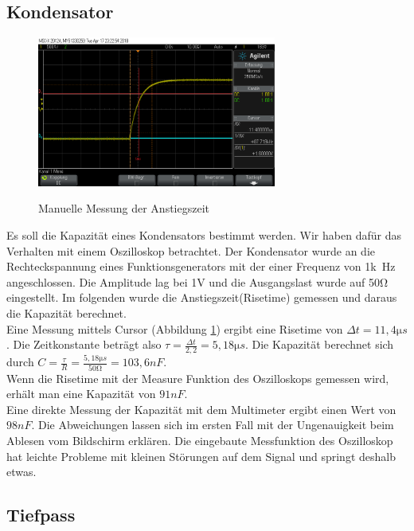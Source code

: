 \documentclass[a4paper]{article}
\begin{document}
    \subsection{Kondensator}
    \begin{figure}
    \caption{Manuelle Messung der Anstiegszeit}
    \centering
    \includegraphics[width=0.7\textwidth]{c_manuell}
    \label{fig:c_man}
    \end{figure}
    Es soll die Kapazität eines Kondensators bestimmt werden. Wir haben dafür das Verhalten mit einem Oszilloskop betrachtet. Der Kondensator wurde an die Rechteckspannung eines Funktionsgenerators mit der einer Frequenz von 1\si{k\Hz} angeschlossen. Die Amplitude lag bei 1\si{V} und die Ausgangslast wurde auf 50\si{\ohm} eingestellt. Im folgenden wurde die Anstiegszeit(Risetime) gemessen und daraus die Kapazität berechnet.\\
    Eine Messung mittels Cursor (Abbildung \ref{fig:c_man}) ergibt eine Risetime von $\Delta t=11,4\si{\micro s}$. Die Zeitkonstante beträgt also $\tau = \frac{\Delta t}{2,2} = 5,18\si{\micro s}$. Die Kapazität berechnet sich durch $C=\frac{\tau}{R}=\frac{5,18\si{\micro s}}{50\si{\ohm}}=103,6\si{n F}$. \\
    Wenn die Risetime mit der Measure Funktion des Oszilloskops gemessen wird, erhält man eine Kapazität von $91\si{n F}$.\\
    Eine direkte Messung der Kapazität mit dem Multimeter ergibt einen Wert von $98\si{n F}$.
    Die Abweichungen lassen sich im ersten Fall mit der Ungenauigkeit beim Ablesen vom Bildschirm erklären. Die eingebaute Messfunktion des Oszilloskop hat leichte Probleme mit kleinen Störungen auf dem Signal und springt deshalb etwas.
    
    \subsection{Tiefpass}
\end{document}
